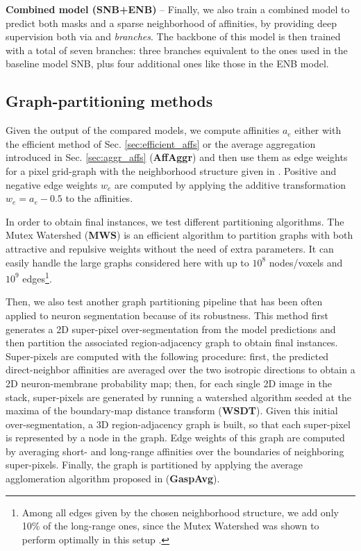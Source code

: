 \textbf{Combined model (SNB+ENB)} -- Finally, we also train a combined model to predict both \maskname masks and a sparse neighborhood of affinities, by providing deep supervision both via \emph{\encBr} and \emph{\sparseBr} \emph{branches}. The backbone of this model is then trained with a total of seven branches: three branches equivalent to the ones used in the baseline model SNB, plus four additional ones like those in the ENB model.  

\subsection{Graph-partitioning methods} 
Given the output of the compared models, we compute affinities $a_e$ either with the efficient method of Sec. \ref{sec:efficient_affs} or the average aggregation introduced in Sec. \ref{sec:aggr_affs} (\textbf{AffAggr}) and then use them as edge weights for a pixel grid-graph with the neighborhood structure given in . Positive and negative edge weights $w_e$ are computed by applying the additive transformation $w_e=a_e-0.5$ to the affinities.

In order to obtain final instances, we test different partitioning algorithms.
The Mutex Watershed (\textbf{MWS}) \cite{wolf2018mutex} is an efficient algorithm to partition graphs with both attractive and repulsive weights without the need of extra parameters. It can easily handle the large graphs considered here with up to $10^8$ nodes/voxels and $10^9$ edges\footnote{Among all edges given by the chosen neighborhood structure, we add only 10\% of the long-range ones, since the Mutex Watershed was shown to perform optimally in this setup \cite{bailoni2019generalized,wolf2018mutex}.}. 

Then, we also test another graph partitioning pipeline that has been often applied to neuron segmentation because of its robustness. This method first generates a 2D super-pixel over-segmentation from the model predictions and then partition the associated region-adjacency graph to obtain final instances. Super-pixels are computed with the following procedure: first, the predicted direct-neighbor affinities are averaged over the two isotropic directions to obtain a 2D neuron-membrane probability map; then, for each single 2D image in the stack, super-pixels are generated by running a watershed algorithm seeded at the maxima of the boundary-map distance transform (\textbf{WSDT}). Given this initial over-segmentation, a 3D region-adjacency graph is built, so that each super-pixel is represented by a node in the graph. Edge weights of this graph are computed by averaging short- and long-range affinities over the boundaries of neighboring super-pixels. 
Finally, the graph is partitioned by applying the average agglomeration algorithm proposed in \cite{bailoni2019generalized} (\textbf{GaspAvg}).

